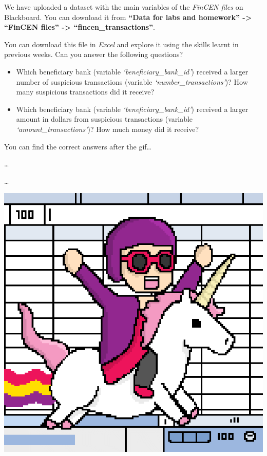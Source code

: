 \documentclass[
]{book}
\providecommand{\tightlist}{%
  \setlength{\itemsep}{0pt}\setlength{\parskip}{0pt}}
\begin{document}
We have uploaded a dataset with the main variables of the \emph{FinCEN files} on Blackboard. You can download it from \textbf{``Data for labs and homework'' -\textgreater{} ``FinCEN files'' -\textgreater{} ``fincen\_transactions''}.

You can download this file in \emph{Excel} and explore it using the skills learnt in previous weeks. Can you answer the following questions?

\begin{itemize}
\tightlist
\item
  Which beneficiary bank (variable \emph{`beneficiary\_bank\_id'}) received a larger number of suspicious transactions (variable \emph{`number\_transactions'})? How many suspicious transactions did it receive?
\item
  Which beneficiary bank (variable \emph{`beneficiary\_bank\_id'}) received a larger amount in dollars from suspicious transactions (variable \emph{`amount\_transactions'})? How much money did it receive?
\end{itemize}

You can find the correct answers after the gif\ldots{}

\ldots{}

\ldots{}

\includegraphics{imgs/horse_excel.gif}
\end{document}
